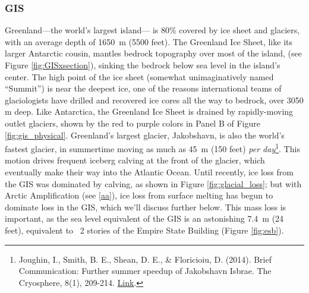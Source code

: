 \subsubsection{GIS} Greenland---the world's largest island--- is 80\% covered by ice sheet and glaciers, with an average depth of \SI{1650}{\metre} (5500 feet). The Greenland Ice Sheet, like its larger Antarctic cousin, mantles bedrock topography over most of the island, (see Figure \ref{fig:GISxsection}), sinking the bedrock below sea level in the island's center. The high point of the ice sheet (somewhat unimaginatively named ``Summit'') is near the deepest ice, one of the reasons international teams of glaciologists have drilled and recovered ice cores all the way to bedrock, over 3050 m deep. Like Antarctica, the Greenland Ice Sheet is drained by rapidly-moving outlet glaciers, shown by the red to purple colors in Panel B of Figure \ref{fig:gis_physical}. Greenland's largest glacier, Jakobshavn, is also the world's fastest glacier, in summertime moving as much as \SI{45}{\metre} (150 feet) \textit{per day}\footnote{Joughin, I., Smith, B. E., Shean, D. E., \& Floricioiu, D. (2014). Brief Communication: Further summer speedup of Jakobshavn Isbrae. The Cryosphere, 8(1), 209-214. \href{https://doi.org/10.5194/tc-8-209-2014}{Link}.}. This motion drives frequent iceberg calving at the front of the glacier, which  eventually make their way into the Atlantic Ocean. Until recently, ice loss from the GIS was dominated by calving, as shown in Figure \ref{fig:glacial_loss}; but with Arctic Amplification (see \ref{aa}), ice loss from surface melting has begun to dominate loss in the GIS, which we'll discuss further below. This mass loss is important, as the sea level equivalent of the GIS is an astonishing \SI{7.4}{\metre} (24 feet), equivalent to ~2 stories of the Empire State Building (Figure \ref{fig:esb}).\\

